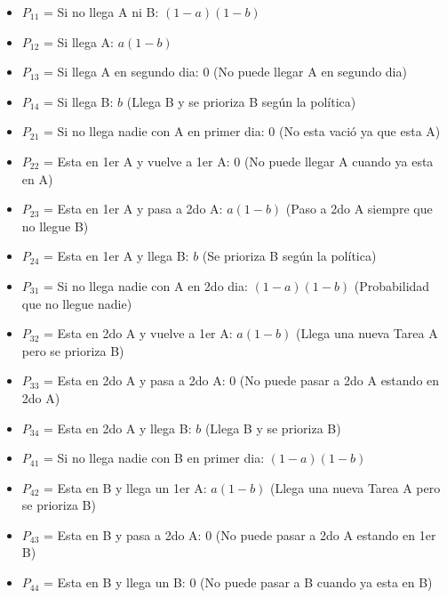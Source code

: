 \documentclass{templateNote}
\begin{document}
\begin{enumerate}[start = 3]
\begin{enumerate}[label = \alph*)]
\begin{center}
            \begin{itemize}
                \item $P_{11}$ = Si no llega A ni B: $(1-a)(1-b)$
                \item $P_{12}$ = Si llega A: $a(1-b)$
                \item $P_{13}$ = Si llega A en segundo dia: $0$ (No puede llegar A en segundo dia)
                \item $P_{14}$ = Si llega B: $b$ (Llega B y se prioriza B según la política) 
                \item $P_{21}$ = Si no llega nadie con A en primer dia: $0$ (No esta vació ya que esta A)
                \item $P_{22}$ = Esta en 1er A y vuelve a 1er A: $0$ (No puede llegar A cuando ya esta en A)
                \item $P_{23}$ = Esta en 1er A y pasa a 2do A: $a(1-b)$ (Paso a 2do A siempre que no llegue B)
                \item $P_{24}$ = Esta en 1er A y llega B: $b$ (Se prioriza B según la política) 
                \item $P_{31}$ = Si no llega nadie con A en 2do dia: $(1-a)(1-b)$ (Probabilidad que no llegue nadie)
                \item $P_{32}$ = Esta en 2do A y vuelve a 1er A: $a(1-b)$ (Llega una nueva Tarea A pero se prioriza B)
                \item $P_{33}$ = Esta en 2do A y pasa a 2do A: $0$ (No puede pasar a 2do A estando en 2do A)
                \item $P_{34}$ = Esta en 2do A y llega B: $b$ (Llega B y se prioriza B)
                \item $P_{41}$ = Si no llega nadie con B en primer dia: $(1-a)(1-b)$ 
                \item $P_{42}$ = Esta en B y llega un 1er A: $a(1-b)$ (Llega una nueva Tarea A pero se prioriza B)
                \item $P_{43}$ = Esta en B y pasa a 2do A: $0$ (No puede pasar a 2do A estando en 1er B)
                \item $P_{44}$ = Esta en B y llega un B: $0$ (No puede pasar a B cuando ya esta en B)
            \end{itemize}


\end{center}
\end{enumerate}
\end{enumerate}
\end{document}
